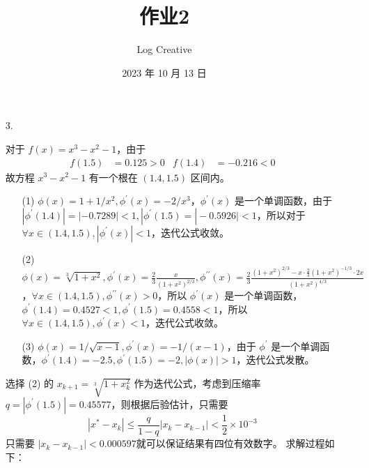 \documentclass{sjtuarticle}
\title{作业2}
\author{Log Creative}
\date{2023 年 10 月 13 日}
\begin{document}
\maketitle
\begin{itemize}
    \item[3.] \begin{solution}
        对于 $f(x)=x^3-x^2-1$，由于
    \begin{align*}
        f(1.5)&=0.125>0 & f(1.4)&=-0.216<0 
    \end{align*}
    故方程 $x^3-x^2-1$ 有一个根在 $(1.4,1.5)$ 区间内。
    \begin{itemize}
        \item[(1)] $\phi(x)=1+1/x^2,\phi^\prime(x)=-2/x^3$，$\phi^\prime(x)$ 是一个单调函数，由于 $|\phi^\prime(1.4)|=|-0.7289|<1,|\phi^\prime(1.5)=|-0.5926|<1$，所以对于 $\forall x \in (1.4,1.5), |\phi^\prime(x)|<1$，迭代公式收敛。
        \item[(2)] $\phi(x)=\sqrt[3]{1+x^2},\phi^\prime(x)=\frac{2}{3}\frac{x}{(1+x^2)^{2/3}},\phi^{\prime\prime}(x)=\frac{2}{3}\frac{(1+x^2)^{2/3}-x\cdot\frac{2}{3}(1+x^2)^{-1/3}\cdot 2x}{(1+x^2)^{4/3}}$，$\forall x\in(1.4,1.5),\phi^{\prime\prime}(x)>0$，所以 $\phi^\prime(x)$ 是一个单调函数，$\phi^\prime(1.4)=0.4527<1,\phi^\prime(1.5)=0.4558<1$，所以 $\forall x\in (1.4,1.5), \phi^\prime(x)<1$，迭代公式收敛。
        \item[(3)] $\phi(x)=1/\sqrt{x-1},\phi^\prime(x)=-1/(x-1)$，由于 $\phi^\prime$ 是一个单调函数，$\phi^\prime(1.4)=-2.5,\phi^\prime(1.5)=-2,|\phi(x)|>1$，迭代公式发散。
    \end{itemize}
    选择 (2) 的 $x_{k+1}=\sqrt[3]{1+x_k^2}$ 作为迭代公式，考虑到压缩率 $q=|\phi^\prime(1.5)|=0.45577$，则根据后验估计，只需要
    \begin{equation*}
        |x^*-x_k|\leq \frac{q}{1-q} |x_k-x_{k-1}|<\frac{1}{2}\times 10^{-3}
    \end{equation*}
    只需要 $|x_k-x_{k-1}|<0.000597$就可以保证结果有四位有效数字。
    求解过程如下：



\end{solution}
\end{itemize}
\end{document}
